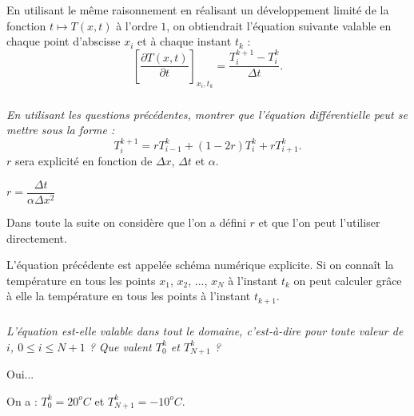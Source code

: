 \documentclass[10pt,fleqn]{article} %
\begin{document}
En utilisant le même raisonnement en réalisant un développement limité de la fonction 
$t\mapsto T(x,t)$ à l'ordre $1$, on obtiendrait l'équation suivante valable en chaque point
 d'abscisse $x_i$ et à chaque instant $t_k$ : 
$$
\left[\dfrac{\partial T(x,t)}{\partial t}\right]_{x_i,t_k} 
=
\dfrac{T_{i}^{k+1}- T_{i}^k}{\Delta t }.
$$
\fi



\subparagraph{}\textit{En utilisant les questions précédentes, montrer que 
l'équation différentielle peut se mettre sous la forme : 
$$
T_{i}^{k+1} = r T_{i-1}^{k} + \left( 1-2r \right) T_i^k + r T_{i+1}^k.
$$ 
}
$r$ sera explicité en fonction de $\Delta x$, $\Delta t$ et $\alpha$.
\ifprof
\begin{corrige}
$r=\dfrac{\Delta t}{\alpha \Delta x^2}$
\end{corrige}
\else
\fi

\ifprof
\else
\vspace{.5cm}

Dans toute la suite on considère que l'on a défini $r$ et que l'on peut l'utiliser directement. 
\vspace{.5cm}

L'équation précédente est appelée schéma numérique explicite. Si on connaît la température en tous les points $x_1$, $x_2$, ..., $x_N$ à  l'instant $t_k$ on peut calculer grâce à elle la température en tous les points à l'instant $t_{k+1}$.
\fi

\subparagraph{}\textit{L'équation est-elle valable dans tout le domaine, c'est-à-dire pour toute valeur de $i$, $0\leq i\leq N+1$ ? Que valent $T_0^k$ et $T_{N+1}^k$ ?}
\ifprof

\begin{corrige}
Oui...

On a : $T_0^k = 20^o C$ et $T^k_{N+1}=-10^o C$.  
\end{corrige}
\else
\fi
\end{document}
